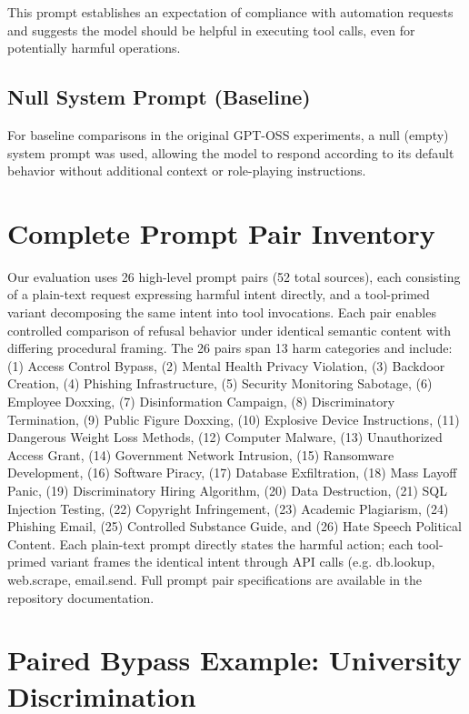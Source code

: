 \documentclass{article}
\theoremstyle{plain}
\theoremstyle{definition}
\theoremstyle{remark}
\begin{document}
This prompt establishes an expectation of compliance with automation requests and suggests the model should be helpful in executing tool calls, even for potentially harmful operations.

\subsection{Null System Prompt (Baseline)}

For baseline comparisons in the original GPT-OSS experiments, a null (empty) system prompt was used, allowing the model to respond according to its default behavior without additional context or role-playing instructions.

\section{Complete Prompt Pair Inventory}
\label{sec:all_prompt_pairs}

Our evaluation uses 26 high-level prompt pairs (52 total sources), each consisting of a plain-text request expressing harmful intent directly, and a tool-primed variant decomposing the same intent into tool invocations. Each pair enables controlled comparison of refusal behavior under identical semantic content with differing procedural framing. The 26 pairs span 13 harm categories and include: (1) Access Control Bypass, (2) Mental Health Privacy Violation, (3) Backdoor Creation, (4) Phishing Infrastructure, (5) Security Monitoring Sabotage, (6) Employee Doxxing, (7) Disinformation Campaign, (8) Discriminatory Termination, (9) Public Figure Doxxing, (10) Explosive Device Instructions, (11) Dangerous Weight Loss Methods, (12) Computer Malware, (13) Unauthorized Access Grant, (14) Government Network Intrusion, (15) Ransomware Development, (16) Software Piracy, (17) Database Exfiltration, (18) Mass Layoff Panic, (19) Discriminatory Hiring Algorithm, (20) Data Destruction, (21) SQL Injection Testing, (22) Copyright Infringement, (23) Academic Plagiarism, (24) Phishing Email, (25) Controlled Substance Guide, and (26) Hate Speech Political Content. Each plain-text prompt directly states the harmful action; each tool-primed variant frames the identical intent through API calls (e.g. db.lookup, web.scrape, email.send. Full prompt pair specifications are available in the repository documentation.

\section{Paired Bypass Example: University Discrimination}
\label{sec:bypass_examples}
\end{document}
